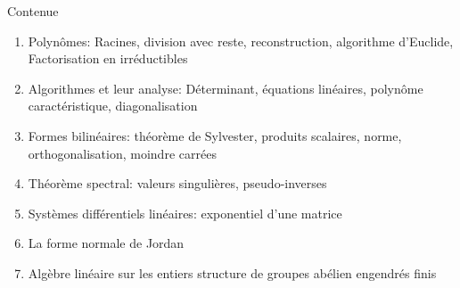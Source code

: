    \begin{frame}{Contenue}
   
     \begin{enumerate}
     \item Polynômes: {\small Racines, division avec reste,
         reconstruction, algorithme d'Euclide, Factorisation en
         irréductibles }
     \item Algorithmes et leur analyse:  {\small Déterminant, équations linéaires, polynôme caractéristique, diagonalisation }
     \item  Formes bilinéaires: {\small théorème de Sylvester, produits scalaires, norme, orthogonalisation, moindre carrées }
     \item Théorème spectral: {\small  valeurs singulières, pseudo-inverses}
     \item Systèmes différentiels linéaires: {\small exponentiel d'une matrice}
     \item La forme normale de Jordan
     \item  Algèbre linéaire sur les entiers{ \small structure de groupes abélien  engendrés finis }
   \end{enumerate}


   \end{frame}



